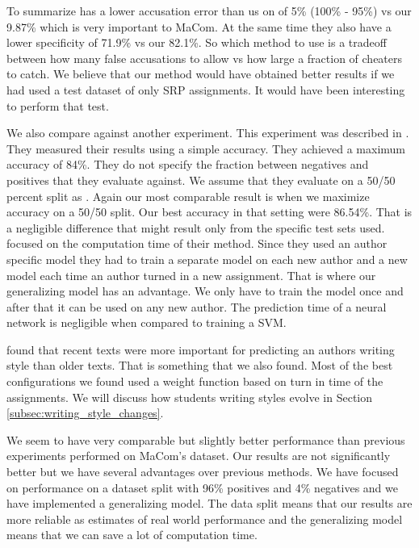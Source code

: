 To summarize \citet{aalykke2016} has a lower accusation error than us on of 5\%
(100\% - 95\%) vs our 9.87\% which is very important to MaCom. At the same time
they also have a lower specificity of 71.9\% vs our 82.1\%. So which method to
use is a tradeoff between how many false accusations to allow vs how large a
fraction of cheaters to catch. We believe that our method would have obtained
better results if we had used a test dataset of only \gls{SRP} assignments. It
would have been interesting to perform that test.

We also compare against another experiment. This experiment was described in
\citep{hansen2014}. They measured their results using a simple accuracy. They
achieved a maximum accuracy of 84\%. They do not specify the fraction between
negatives and positives that they evaluate against. We assume that they evaluate
on a 50/50 percent split as \citet{aalykke2016}. Again our most comparable
result is when we maximize accuracy on a 50/50 split. Our best accuracy in that
setting were 86.54\%. That is a negligible difference that might result only
from the specific test sets used. \citet{hansen2014} focused on the computation
time of their method. Since they used an author specific model they had to train
a separate model on each new author and a new model each time an author turned
in a new assignment. That is where our generalizing model has an advantage.
We only have to train the model once and after that it can be used on any new
author. The prediction time of a neural network is negligible when compared to
training a \gls{SVM}.

\citet{hansen2014} found that recent texts were more important for predicting an
authors writing style than older texts. That is something that we also found.
Most of the best configurations we found used a weight function based on turn in
time of the assignments. We will discuss how students writing styles evolve in
Section \ref{subsec:writing_style_changes}.

We seem to have very comparable but slightly better performance than previous
experiments performed on MaCom's dataset. Our results are not significantly
better but we have several advantages over previous methods. We have focused on
performance on a dataset split with 96\% positives and 4\% negatives and we have
implemented a generalizing model. The data split means that our results are more
reliable as estimates of real world performance and the generalizing model means
that we can save a lot of computation time.


